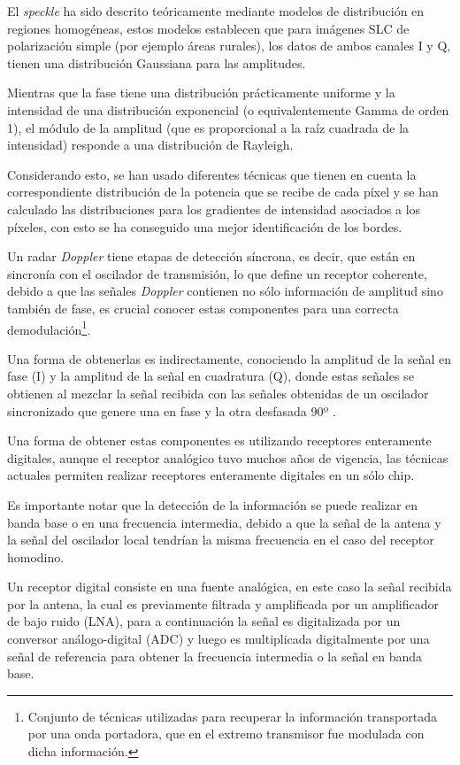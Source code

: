 El \textit{speckle} ha sido descrito teóricamente mediante modelos de distribución en regiones homogéneas, estos modelos establecen que para imágenes SLC de polarización simple (por ejemplo áreas rurales), los datos de ambos canales I y Q, tienen una distribución Gaussiana para las amplitudes. 

Mientras que la fase tiene una distribución prácticamente uniforme y la intensidad de una distribución exponencial (o equivalentemente Gamma de orden 1), el módulo de la amplitud (que es proporcional a la raíz cuadrada de la intensidad) responde a una distribución de Rayleigh. 

Considerando esto, se han usado diferentes técnicas que tienen en cuenta la correspondiente distribución de la potencia que se recibe de cada píxel y se han calculado las distribuciones para los gradientes de intensidad asociados a los píxeles, con esto se ha conseguido una mejor identificación de los bordes.


Un radar \textit{Doppler} tiene etapas de detección síncrona, es decir, que están en sincronía con el oscilador de transmisión, lo que define un receptor coherente, debido a que las señales \textit{Doppler} contienen no sólo información de amplitud sino también de fase, es crucial conocer estas componentes para una correcta demodulación\footnote{Conjunto de técnicas utilizadas para recuperar la información transportada por una onda portadora, que en el extremo transmisor fue modulada con dicha información.}.

Una forma de obtenerlas es indirectamente, conociendo la amplitud de la señal en fase (I) y la amplitud de la señal en cuadratura (Q), donde estas señales se obtienen al mezclar la señal recibida con las señales obtenidas de un oscilador sincronizado que genere una en fase y la otra desfasada 90º \cite{CastilloPlasencia2016Oct}.

Una forma de obtener estas componentes es utilizando receptores enteramente digitales, aunque el receptor analógico tuvo muchos años de vigencia, las técnicas actuales permiten realizar receptores enteramente digitales en un sólo chip.

Es importante notar que la detección de la información se puede realizar en banda base o en una frecuencia intermedia, debido a que la señal de la antena y la señal del oscilador local tendrían la misma frecuencia en el caso del receptor homodino. 

Un receptor digital consiste en una fuente analógica, en este caso la señal recibida por la antena, la cual es previamente filtrada y amplificada por un amplificador de bajo ruido (LNA), para a continuación la señal es digitalizada por un conversor análogo-digital (ADC) y luego es multiplicada digitalmente por una señal de referencia para obtener la frecuencia intermedia o la señal en banda base. 


